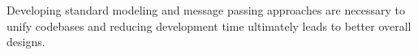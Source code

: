 \documentclass[heading.tex]{subfiles}
\begin{document}
Developing standard modeling and message passing approaches are necessary to unify
codebases and reducing development time ultimately leads to better overall designs.



\cite{Turbofan}
\cite{NonlinearDynamic}
\cite{MatlabOOP}
\cite{Volume Dynamic}
\cite{TTECTrA}
\cite{NPSS}
\end{document}
